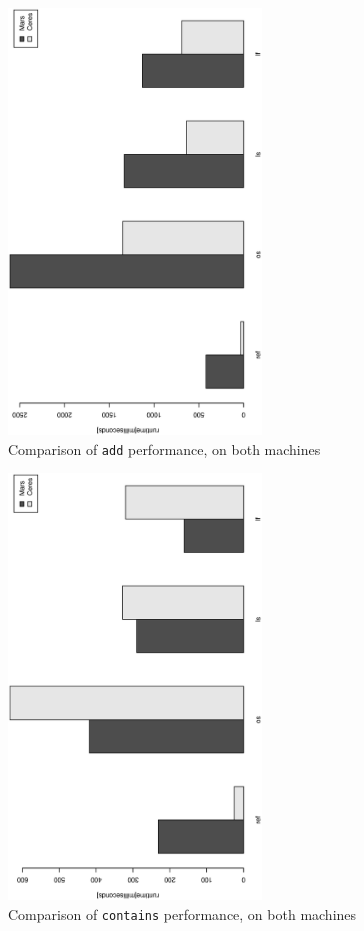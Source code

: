 \begin{figure}[H]
  \centering 
  \includegraphics[width=0.6\textwidth, angle=270]{pictures/throughput_add.eps}
  \caption{Comparison of \texttt{add} performance, on both machines}
  \label{addthrough}
\end{figure}

\begin{figure}[H]
  \centering 
  \includegraphics[width=0.6\textwidth, angle=270]{pictures/throughput_contains.eps}
  \caption{Comparison of \texttt{contains} performance, on both machines}
  \label{containsthrough}
\end{figure}

